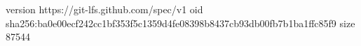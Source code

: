 version https://git-lfs.github.com/spec/v1
oid sha256:ba0e00ecf242cc1bf353f5c1359d4fe08398b8437cb93db00fb7b1ba1ffc85f9
size 87544
